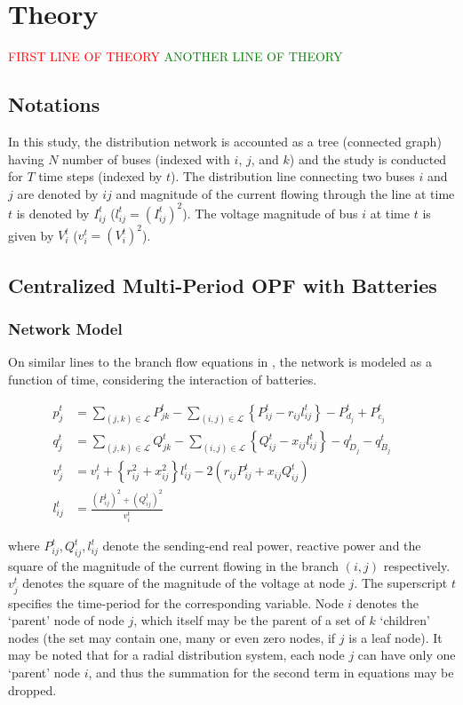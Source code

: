\documentclass{article}
\begin{document}
\section{Theory}
\textcolor{red}{FIRST LINE OF THEORY}
\textcolor{green}{ANOTHER LINE OF THEORY}

\subsection{Notations}
In this study, the distribution network is accounted as a tree (connected graph) having \(N\) number of buses (indexed with \(i\), \(j\), and \(k\)) and the study is conducted for \(T\) time steps (indexed by \(t\)). The distribution line connecting two buses \(i\) and \(j\) are denoted by {\(ij\)} and magnitude of the current flowing through the line at time \(t\) is denoted by \(I_{ij}^t\) (\(l_{ij}^t=\left(I_{ij}^t\right)^2\)). The voltage magnitude of bus \(i\) at time \(t\) is given by \(V_i^t\) (\(v_i^t=\left(V_i^t\right)^2\)). 

\subsection{Centralized Multi-Period OPF with Batteries}

\subsubsection{Network Model}

On similar lines to the branch flow equations in \cite{bfm01}, the network is modeled as a function of time, considering the interaction of batteries.

\begin{align}
    {p_j^t} & = {\sum_{(j, k) \in \mathcal{L}} P_{jk}^t - \sum_{(i, j) \in \mathcal{L}}\left\{P_{ij}^t - r_{ij}l_{ij}^t\right\} - P_{d_j}^t + P_{c_j}^t} && \label{eq:Pij} \\ 
    {q_j^t} & = {\sum_{(j, k) \in \mathcal{L}} Q_{jk}^t - \sum_{(i, j) \in \mathcal{L}}\left\{Q_{ij}^t - x_{ij}l_{ij}^t\right\} - q_{D_j}^t - q_{B_j}^t} && \label{eq:Qij} \\ 
    {v_j^t} & = {v_{i}^t +  \left\{r_{ij}^2 + x_{ij}^2\right\}l_{ij}^t - 2(r_{ij}P_{ij}^t + x_{ij}Q_{ij}^t)} \label{eq:vj} && \\
    {l_{ij}^t} & = {\frac{(P_{ij}^{t})^2 + (Q_{ij}^{t})^2}{v_i^t}} \label{eq:lij}
\end{align}

where $P^{t}_{ij}, Q^{t}_{ij}, l^{t}_{ij}$ denote the sending-end real power, reactive power and the square of the magnitude of the current flowing in the branch $(i, j)$ respectively. $v^{t}_{j}$ denotes the square of the magnitude of the voltage at node $j$. The superscript $t$ specifies the time-period for the corresponding variable. Node $i$ denotes the `parent' node of node $j$, which itself may be the parent of a set of $k$ `children' nodes (the set may contain one, many or even zero nodes, if $j$ is a leaf node). It may be noted that for a radial distribution system, each node $j$ can have only one `parent' node $i$, and thus the summation for the second term in equations  may be dropped.
\end{document}
